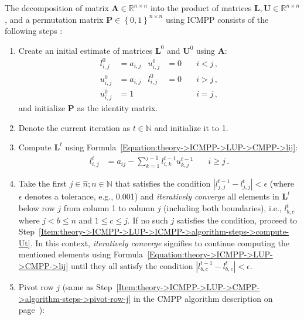 The decomposition of matrix $\mathbf{A} \in \mathbb{R}^{n \times n}$ into the product of matrices $\mathbf{L}, \mathbf{U} \in \mathbb{R}^{n \times n}$, and a permutation matrix $\mathbf{P} \in \left\{0,1\right\}^{n \times n}$ using ICMPP consists of the following steps \cite{Cejka2022}:

\begin{enumerate}
	\item Create an initial estimate of matrices $\mathbf{L}^{0}$ and $\mathbf{U}^{0}$ using $\mathbf{A}$:
		\begin{align}
			l_{i,j}^{0} &= a_{i,j} & u_{i,j}^{0} &= 0 \quad &i < j \nonumber\,, \\
			u_{i,j}^{0} &= a_{i,j} & l_{i,j}^{0} &= 0 \quad &i > j \nonumber\,, \\
			u_{i,j}^{0} &= 1	   &			 & \quad    &i = j \nonumber\,,
		\end{align}
		and initialize $\mathbf{P}$ as the identity matrix.
	\item Denote the current iteration as $t \in \mathbb{N}$ and initialize it to 1.
	\item \label{Item:theory->ICMPP->LUP->ICMPP->algorithm-steps->compute-Lt}
		Compute $\mathbf{L}^{t}$ using Formula~\ref{Equation:theory->ICMPP->LUP->CMPP->lij}:
		\begin{align}
			l_{i,j}^{t} &= a_{ij} - \sum_{k=1}^{j-1}l_{i,k}^{t-1}u_{k,j}^{t-1} &\quad i \geq j \nonumber\,.
		\end{align}
	\item \label{Item:theory->ICMPP->LUP->ICMPP->algorithm-steps->converge-lower-sections}
		Take the first $j \in \widehat{n}; n \in \mathbb{N}$ that satisfies the condition $\left|l^{t-1}_{j, j} - l^{t}_{j, j}\right| < \epsilon$ (where $\epsilon$ denotes a tolerance, e.g., 0.001) and \textit{iteratively converge} all elements in $\mathbf{L}^{t}$ below row $j$ from column 1 to column $j$ (including both boundaries), i.e., $l^{t}_{b, c}$ where $j < b \leq n$ and $1 \leq c \leq j$.
If no such $j$ satisfies the condition, proceed to Step~\ref{Item:theory->ICMPP->LUP->ICMPP->algorithm-steps->compute-Ut}.
In this context, \textit{iteratively converge} signifies to continue computing the mentioned elements using Formula~\ref{Equation:theory->ICMPP->LUP->CMPP->lij} until they all satisfy the condition $\left|l^{t-1}_{b, c} - l^{t}_{b, c}\right| < \epsilon$.
	\item \label{Item:theory->ICMPP->LUP->ICMPP->algorithm-steps->pivot-row}
		Pivot row $j$ (same as Step~\ref{Item:theory->ICMPP->LUP->CMPP->algorithm-steps->pivot-row-j} in the CMPP algorithm description on page~\pageref{Item:theory->ICMPP->LUP->CMPP->algorithm-steps->pivot-row-j}):

\end{enumerate}

